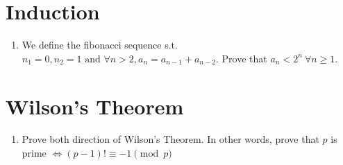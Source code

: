 \documentclass[12pt]{article}
\newcommand{\tand}{\text{ and }}
\begin{document}
\section*{Induction}
\begin{enumerate}
  \item We define the fibonacci sequence s.t. $n_1 = 0, n_2 = 1 \tand \forall n > 2, a_n = a_{n-1} + a_{n-2}$. Prove that $a_n < 2^n ~\forall n \geq 1$.
\end{enumerate}

\section*{Wilson's Theorem}
\begin{enumerate}
  \item Prove both direction of Wilson's Theorem. In other words, prove that $p$ is prime $\iff (p-1)! \equiv -1 \pmod{p}$
\end{enumerate}
\end{document}
